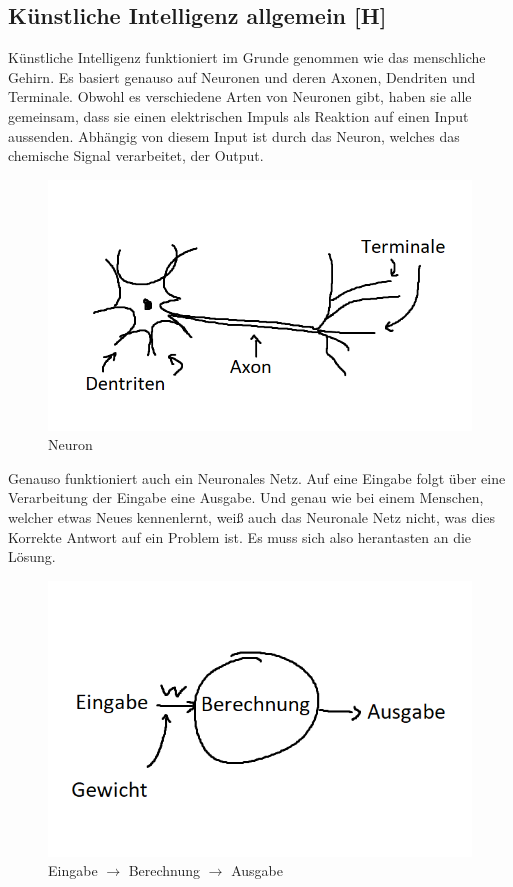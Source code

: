 \subsection{Künstliche Intelligenz allgemein [H]}\label{tech:ki:head}
Künstliche Intelligenz funktioniert im Grunde genommen wie das menschliche Gehirn. Es basiert genauso auf Neuronen und deren Axonen, Dendriten und Terminale. Obwohl es verschiedene Arten von Neuronen gibt, haben sie alle gemeinsam, dass sie einen elektrischen Impuls als Reaktion auf einen Input aussenden. Abhängig von diesem Input ist durch das Neuron, welches das chemische Signal verarbeitet, der Output.

\begin{figure}[H]
    \centering
    \includegraphics[scale=1]{pics/Neuron.png}
    \caption{Neuron}
    \label{fig:tech:Neuron}
\end{figure}

Genauso funktioniert auch ein Neuronales Netz. Auf eine Eingabe folgt über eine Verarbeitung der Eingabe eine Ausgabe. Und genau wie bei einem Menschen, welcher etwas Neues kennenlernt, weiß auch das Neuronale Netz nicht, was dies Korrekte Antwort auf ein Problem ist. Es muss sich also herantasten an die Lösung.

\begin{figure}[H]
    \centering
    \includegraphics[scale=1]{pics/eba.png}
    \caption{Eingabe $\rightarrow$ Berechnung $\rightarrow$ Ausgabe}
    \label{fig:tech:eba}
\end{figure}

